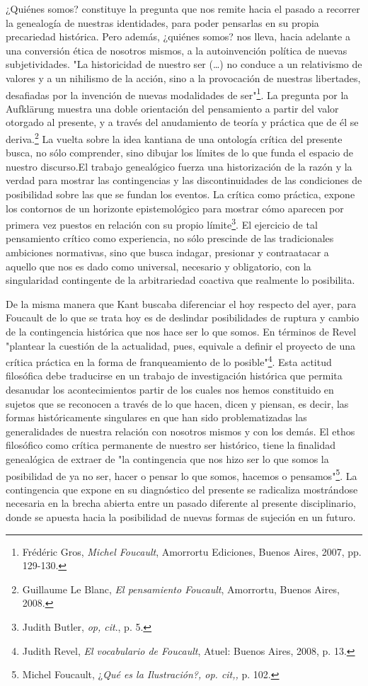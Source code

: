 \documentclass{book}
\begin{document}
¿Quiénes somos? constituye la pregunta que nos remite hacia el pasado a
recorrer la genealogía de nuestras identidades, para poder pensarlas en
su propia precariedad histórica. Pero además, ¿quiénes somos? nos lleva,
hacia adelante a una conversión ética de nosotros mismos, a la
autoinvención política de nuevas subjetividades. "La historicidad de
nuestro ser (\dots) no conduce a un relativismo de valores y a un
nihilismo de la acción, sino a la provocación de nuestras libertades,
desafiadas por la invención de nuevas modalidades de ser"\footnote{Frédéric
  Gros, \emph{Michel Foucault}, Amorrortu Ediciones, Buenos Aires, 2007,
  pp. 129-130.}. La pregunta por la Aufklärung muestra una doble
orientación del pensamiento a partir del valor otorgado al presente, y a
través del anudamiento de teoría y práctica que de él se
deriva.\footnote{Guillaume Le Blanc, \emph{El pensamiento Foucault},
  Amorrortu, Buenos Aires, 2008.} La vuelta sobre la idea kantiana de
una ontología crítica del presente busca, no sólo comprender, sino
dibujar los límites de lo que funda el espacio de nuestro discurso.El
trabajo genealógico fuerza una historización de la razón y la verdad
para mostrar las contingencias y las discontinuidades de las condiciones
de posibilidad sobre las que se fundan los eventos. La crítica como
práctica, expone los contornos de un horizonte epistemológico para
mostrar cómo aparecen por primera vez puestos en relación con su propio
límite\footnote{Judith Butler, \emph{op, cit}., p. 5.}. El ejercicio de
tal pensamiento crítico como experiencia, no sólo prescinde de las
tradicionales ambiciones normativas, sino que busca indagar, presionar y
contraatacar a aquello que nos es dado como universal, necesario y
obligatorio, con la singularidad contingente de la arbitrariedad
coactiva que realmente lo posibilita.

De la misma manera que Kant buscaba diferenciar el hoy respecto del
ayer, para Foucault de lo que se trata hoy es de deslindar posibilidades
de ruptura y cambio de la contingencia histórica que nos hace ser lo que
somos. En términos de Revel "plantear la cuestión de la actualidad,
pues, equivale a definir el proyecto de una crítica práctica en la forma
de franqueamiento de lo posible"\footnote{Judith Revel, \emph{El
  vocabulario de Foucault}, Atuel: Buenos Aires, 2008, p. 13.}. Esta
actitud filosófica debe traducirse en un trabajo de investigación
histórica que permita desanudar los acontecimientos partir de los cuales
nos hemos constituido en sujetos que se reconocen a través de lo que
hacen, dicen y piensan, es decir, las formas históricamente singulares
en que han sido problematizadas las generalidades de nuestra relación
con nosotros mismos y con los demás. El ethos filosófico como crítica
permanente de nuestro ser histórico, tiene la finalidad genealógica de
extraer de "la contingencia que nos hizo ser lo que somos la posibilidad
de ya no ser, hacer o pensar lo que somos, hacemos o
pensamos"\footnote{Michel Foucault, ¿\emph{Qué es la Ilustración?, op.
  cit,,} p. 102.}. La contingencia que expone en su diagnóstico del
presente se radicaliza mostrándose necesaria en la brecha abierta entre
un pasado diferente al presente disciplinario, donde se apuesta hacia la
posibilidad de nuevas formas de sujeción en un futuro.
\end{document}
